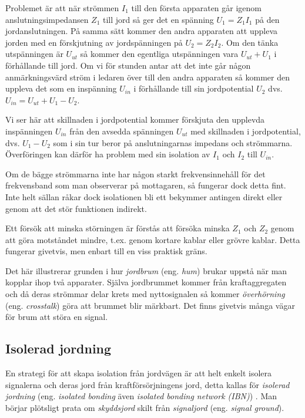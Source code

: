 Problemet är att när strömmen \(I_1\) till den första apparaten går igenom
anslutningsimpedansen \(Z_1\) till jord så ger det en spänning
\(U_1 = Z_1 I_1\) på den jordanslutningen.
På samma sätt kommer den andra apparaten att uppleva jorden med en förskjutning
av jordspänningen på \(U_2 = Z_2 I_2\).
Om den tänka utspänningen är \(U_{ut}\) så kommer den egentliga utspänningen
vara \(U_{ut} + U_1\) i förhållande till jord.
Om vi för stunden antar att det inte går någon anmärkningsvärd ström i ledaren
över till den andra apparaten så kommer den uppleva det som en inspänning
\(U_{in}\) i förhållande till sin jordpotential \(U_2\) dvs.
\(U_{in} = U_{ut} + U_1 - U_2\).

Vi ser här att skillnaden i jordpotential kommer förskjuta den upplevda
inspänningen \(U_{in}\) från den avsedda spänningen \(U_{ut}\) med skillnaden i
jordpotential, dvs. \(U_1 - U_2\) som i sin tur beror på anslutningarnas
impedans och strömmarna.
Överföringen kan därför ha problem med sin isolation av \(I_1\) och \(I_2\)
till \(U_{in}\).

Om de bägge strömmarna inte har någon starkt frekvensinnehåll för det
frekvensband som man observerar på mottagaren, så fungerar dock detta fint.
Inte helt sällan råkar dock isolationen bli ett bekymmer antingen direkt eller
genom att det stör funktionen indirekt.

Ett försök att minska störningen är förstås att försöka minska \(Z_1\) och
\(Z_2\) genom att göra motståndet mindre, t.ex. genom kortare kablar eller
grövre kablar.
Detta fungerar givetvis, men enbart till en viss praktisk gräns.

Det här illustrerar grunden i hur \emph{jordbrum} (eng. \emph{hum}) brukar
uppstå när man kopplar ihop två apparater.
Själva jordbrummet kommer från kraftaggregaten och då deras strömmar delar
krets med nyttosignalen så kommer \emph{överhörning} (eng. \emph{crosstalk})
göra att brummet blir märkbart.
Det finns givetvis många vägar för brum att störa en signal.

\subsection{Isolerad jordning}

En strategi för att skapa isolation från jordvägen är att helt enkelt
isolera signalerna och deras jord från kraftförsörjningens jord, detta kallas
för \emph{isolerad jordning} (eng. \emph{isolated bonding} även \emph{isolated
 bonding network (IBN)}) \cite[kap 3.2.4]{K27-1991}.
Man börjar plötsligt prata om \emph{skyddsjord} skilt från \emph{signaljord}
(eng. \emph{signal ground}).

